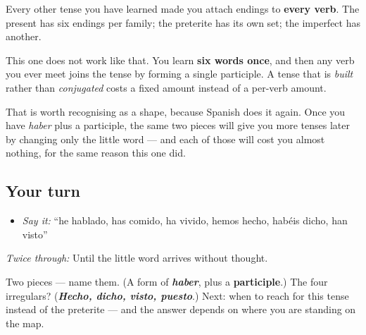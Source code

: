 \begin{grammarlens}[title={Grammar Lens: why this one was cheap}]
Every other tense you have learned made you attach endings to \textbf{every verb}. The present has six endings per family; the preterite has its own set; the imperfect has another.

This one does not work like that. You learn \textbf{six words once}, and then any verb you ever meet joins the tense by forming a single participle. A tense that is \emph{built} rather than \emph{conjugated} costs a fixed amount instead of a per-verb amount.

That is worth recognising as a shape, because Spanish does it again. Once you have \emph{haber} plus a participle, the same two pieces will give you more tenses later by changing only the little word — and each of those will cost you almost nothing, for the same reason this one did.
\end{grammarlens}

\subsection*{Your turn}
\begin{itemize}
\raggedright
  \item \emph{Say it:} \textquotedblleft{}he hablado, has comido, ha vivido, hemos hecho, habéis dicho, han visto\textquotedblright{}
\end{itemize}

\emph{Twice through:} Until the little word arrives without thought.

\begin{tcolorbox}[breakable,colback=teal!4,colframe=teal!35!black,title={Before you move on}]
Two pieces — name them. (A form of \emph{\textbf{haber}}, plus a \textbf{participle}.) The four irregulars? (\emph{\textbf{Hecho, dicho, visto, puesto}}.) Next: when to reach for this tense instead of the preterite — and the answer depends on where you are standing on the map.
\end{tcolorbox}
